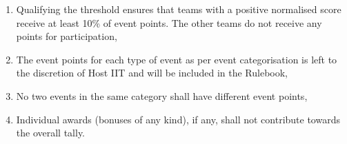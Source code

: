 \begin{enumerate}
    \item Qualifying the threshold ensures that teams with a positive normalised score receive at least 10\% of event points. The other teams do not receive any points for participation, 
    \item The event points for each type of event as per event categorisation is left to the discretion of Host IIT and will be included in the Rulebook,
    \item No two events in the same category shall have different event points,
    \item Individual awards (bonuses of any kind), if any, shall not contribute towards the overall tally.
\end{enumerate}
